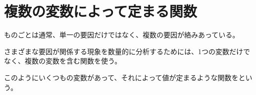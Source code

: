 \documentclass[../../../topic_calculus]{subfiles}
\begin{document}
\sectionline
\section{複数の変数によって定まる関数}

ものごとは通常、単一の要因だけではなく、複数の要因が絡みあっている。

さまざまな要因が関係する現象を数量的に分析するためには、1つの変数だけでなく、複数の変数を含む関数を使う。

\br

このようにいくつもの変数があって、それによって値が定まるような関数をという。
\end{document}
